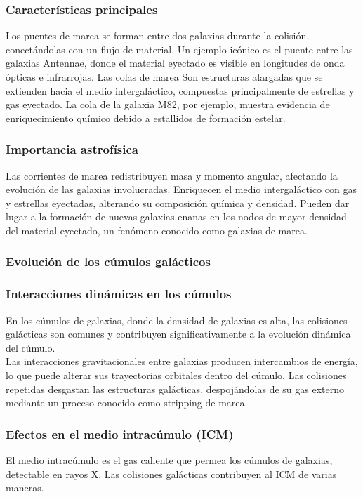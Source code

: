 \documentclass{article}
\begin{document}
\subsubsection*{Características principales}

Los puentes de marea se forman entre dos galaxias durante la colisión, conectándolas con un flujo de material. Un ejemplo icónico es el puente entre las galaxias Antennae, donde el material eyectado es visible en longitudes de onda ópticas e infrarrojas. Las colas de marea Son estructuras alargadas que se extienden hacia el medio intergaláctico, compuestas principalmente de estrellas y gas eyectado. La cola de la galaxia M82, por ejemplo, muestra evidencia de enriquecimiento químico debido a estallidos de formación estelar.

\subsubsection*{Importancia astrofísica}

Las corrientes de marea redistribuyen masa y momento angular, afectando la evolución de las galaxias involucradas. Enriquecen el medio intergaláctico con gas y estrellas eyectadas, alterando su composición química y densidad. Pueden dar lugar a la formación de nuevas galaxias enanas en los nodos de mayor densidad del material eyectado, un fenómeno conocido como galaxias de marea.
\subsubsection{Evolución de los cúmulos galácticos}
\subsubsection*{Interacciones dinámicas en los cúmulos}
En los cúmulos de galaxias, donde la densidad de galaxias es alta, las colisiones galácticas son comunes y contribuyen significativamente a la evolución dinámica del cúmulo. \\

Las interacciones gravitacionales entre galaxias producen intercambios de energía, lo que puede alterar sus trayectorias orbitales dentro del cúmulo.
Las colisiones repetidas desgastan las estructuras galácticas, despojándolas de su gas externo mediante un proceso conocido como stripping de marea.
\subsubsection*{Efectos en el medio intracúmulo (ICM)}
El medio intracúmulo es el gas caliente que permea los cúmulos de galaxias, detectable en rayos X. Las colisiones galácticas contribuyen al ICM de varias maneras. \\
\end{document}
